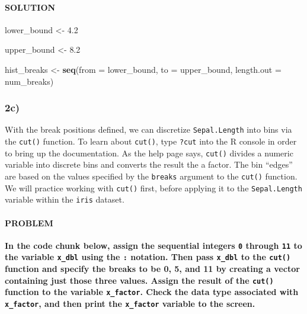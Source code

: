 \documentclass[]{article}
\newenvironment{Shaded}{\begin{snugshade}}{\end{snugshade}}
\newcommand{\DataTypeTok}[1]{\textcolor[rgb]{0.13,0.29,0.53}{#1}}
\newcommand{\FloatTok}[1]{\textcolor[rgb]{0.00,0.00,0.81}{#1}}
\newcommand{\KeywordTok}[1]{\textcolor[rgb]{0.13,0.29,0.53}{\textbf{#1}}}
\newcommand{\NormalTok}[1]{#1}
\newcommand{\StringTok}[1]{\textcolor[rgb]{0.31,0.60,0.02}{#1}}
\let\oldparagraph\paragraph
\renewcommand{\paragraph}[1]{\oldparagraph{#1}\mbox{}}
\begin{document}
\hypertarget{solution-6}{%
\paragraph{SOLUTION}\label{solution-6}}

\begin{Shaded}
\begin{Highlighting}[]
\NormalTok{lower_bound <-}\StringTok{ }\FloatTok{4.2}

\NormalTok{upper_bound <-}\StringTok{ }\FloatTok{8.2}

\NormalTok{hist_breaks <-}\StringTok{ }\KeywordTok{seq}\NormalTok{(}\DataTypeTok{from =}\NormalTok{ lower_bound, }\DataTypeTok{to =}\NormalTok{ upper_bound, }\DataTypeTok{length.out =}\NormalTok{ num_breaks)}
\end{Highlighting}
\end{Shaded}

\hypertarget{c-1}{%
\subsubsection{2c)}\label{c-1}}

With the break positions defined, we can discretize
\texttt{Sepal.Length} into bins via the \texttt{cut()} function. To
learn about \texttt{cut()}, type \texttt{?cut} into the R console in
order to bring up the documentation. As the help page says,
\texttt{cut()} divides a numeric variable into discrete bins and
converts the result the a factor. The bin ``edges'' are based on the
values specified by the \texttt{breaks} argument to the \texttt{cut()}
function. We will practice working with \texttt{cut()} first, before
applying it to the \texttt{Sepal.Length} variable within the
\texttt{iris} dataset.

\hypertarget{problem-8}{%
\paragraph{PROBLEM}\label{problem-8}}

\textbf{In the code chunk below, assign the sequential integers
\texttt{0} through \texttt{11} to the variable \texttt{x\_dbl} using the
\texttt{:} notation. Then pass \texttt{x\_dbl} to the \texttt{cut()}
function and specify the breaks to be 0, 5, and 11 by creating a vector
containing just those three values. Assign the result of the
\texttt{cut()} function to the variable \texttt{x\_factor}. Check the
data type associated with \texttt{x\_factor}, and then print the
\texttt{x\_factor} variable to the screen.}
\end{document}
